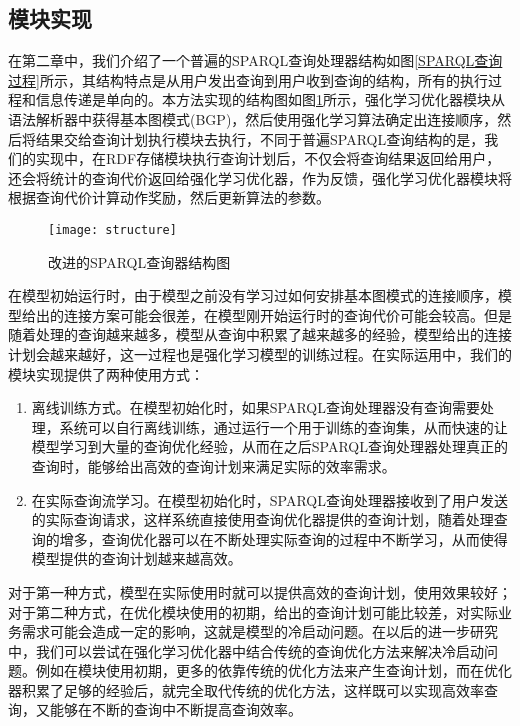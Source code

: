 \subsection{模块实现}
在第二章中，我们介绍了一个普遍的SPARQL查询处理器结构如图\ref{SPARQL查询过程}所示，其结构特点是从用户发出查询到用户收到查询的结构，所有的执行过程和信息传递是单向的。本方法实现的结构图如图\ref{structure}所示，强化学习优化器模块从语法解析器中获得基本图模式(BGP)，然后使用强化学习算法确定出连接顺序，然后将结果交给查询计划执行模块去执行，不同于普遍SPARQL查询结构的是，我们的实现中，在RDF存储模块执行查询计划后，不仅会将查询结果返回给用户，还会将统计的查询代价返回给强化学习优化器，作为反馈，强化学习优化器模块将根据查询代价计算动作奖励，然后更新算法的参数。

\begin{figure}[h]
    \centering
    \texttt{[image: structure]}
    \caption{改进的SPARQL查询器结构图}
    \label{structure}
\end{figure}

在模型初始运行时，由于模型之前没有学习过如何安排基本图模式的连接顺序，模型给出的连接方案可能会很差，在模型刚开始运行时的查询代价可能会较高。但是随着处理的查询越来越多，模型从查询中积累了越来越多的经验，模型给出的连接计划会越来越好，这一过程也是强化学习模型的训练过程。在实际运用中，我们的模块实现提供了两种使用方式：
\begin{enumerate}
    \item 离线训练方式。在模型初始化时，如果SPARQL查询处理器没有查询需要处理，系统可以自行离线训练，通过运行一个用于训练的查询集，从而快速的让模型学习到大量的查询优化经验，从而在之后SPARQL查询处理器处理真正的查询时，能够给出高效的查询计划来满足实际的效率需求。
    \item 在实际查询流学习。在模型初始化时，SPARQL查询处理器接收到了用户发送的实际查询请求，这样系统直接使用查询优化器提供的查询计划，随着处理查询的增多，查询优化器可以在不断处理实际查询的过程中不断学习，从而使得模型提供的查询计划越来越高效。
\end{enumerate}

对于第一种方式，模型在实际使用时就可以提供高效的查询计划，使用效果较好；对于第二种方式，在优化模块使用的初期，给出的查询计划可能比较差，对实际业务需求可能会造成一定的影响，这就是模型的冷启动问题。在以后的进一步研究中，我们可以尝试在强化学习优化器中结合传统的查询优化方法来解决冷启动问题。例如在模块使用初期，更多的依靠传统的优化方法来产生查询计划，而在优化器积累了足够的经验后，就完全取代传统的优化方法，这样既可以实现高效率查询，又能够在不断的查询中不断提高查询效率。

